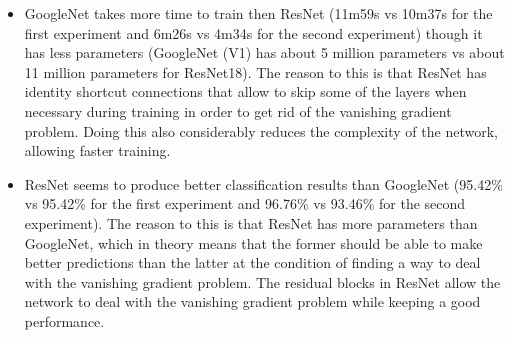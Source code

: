 \documentclass[12pt]{article}
\begin{document}
	\begin{itemize}
		\item GoogleNet takes more time to train then ResNet (11m59s vs 10m37s for the first experiment and 6m26s vs 4m34s for the second experiment) though it has less parameters (GoogleNet (V1) has about 5 million parameters vs about 11 million parameters for ResNet18). The reason to this is that ResNet has identity shortcut connections that allow to skip some of the layers when necessary during training in order to get rid of the vanishing gradient problem. Doing this also considerably reduces the complexity of the network, allowing faster training.
		\item ResNet seems to produce better classification results than GoogleNet (95.42\% vs 95.42\% for the first experiment and 96.76\% vs 93.46\% for the second experiment). The reason to this is that ResNet has more parameters than GoogleNet, which in theory means that the former should be able to make better predictions than the latter at the condition of finding a way to deal with the vanishing gradient problem. The residual blocks in ResNet allow the network to deal with the vanishing gradient problem while keeping a good performance.  
	\end{itemize}
		
		
	
\end{document}
